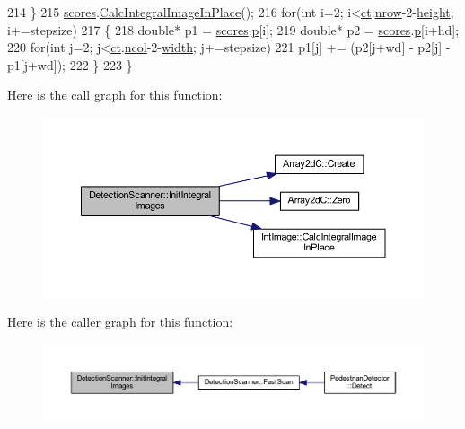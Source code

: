 \begin{DoxyCode}
214     \}
215     \mbox{\hyperlink{class_detection_scanner_a7358ec22675336179d3cad0809c7b883}{scores}}.\mbox{\hyperlink{class_int_image_a4b955bc5382ee4745a5ab92fc48b4a6a}{CalcIntegralImageInPlace}}();
216     \textcolor{keywordflow}{for}(\textcolor{keywordtype}{int} i=2; i<\mbox{\hyperlink{class_detection_scanner_a885861d4c08a9f9ae4da36f68866419b}{ct}}.\mbox{\hyperlink{class_array2d_c_a12f690f7195f7674a86a7e1eedbc473c}{nrow}}-2-\mbox{\hyperlink{class_detection_scanner_a0526f032d5e7efd9fced2592ad5c8d03}{height}}; i+=stepsize)
217     \{
218         \textcolor{keywordtype}{double}* p1 = \mbox{\hyperlink{class_detection_scanner_a7358ec22675336179d3cad0809c7b883}{scores}}.\mbox{\hyperlink{class_array2d_c_a727eae5d663d463635cc150e6f771f0d}{p}}[i];
219         \textcolor{keywordtype}{double}* p2 = \mbox{\hyperlink{class_detection_scanner_a7358ec22675336179d3cad0809c7b883}{scores}}.\mbox{\hyperlink{class_array2d_c_a727eae5d663d463635cc150e6f771f0d}{p}}[i+hd];
220         \textcolor{keywordflow}{for}(\textcolor{keywordtype}{int} j=2; j<\mbox{\hyperlink{class_detection_scanner_a885861d4c08a9f9ae4da36f68866419b}{ct}}.\mbox{\hyperlink{class_array2d_c_a27e0f8f40f644831cd7c750db59dc28a}{ncol}}-2-\mbox{\hyperlink{class_detection_scanner_a37d12c13060640ad0321f089cd565476}{width}}; j+=stepsize)
221             p1[j] += (p2[j+wd] - p2[j] - p1[j+wd]);
222     \}
223 \}
\end{DoxyCode}
Here is the call graph for this function\+:\nopagebreak
\begin{figure}[H]
\begin{center}
\leavevmode
\includegraphics[width=350pt]{class_detection_scanner_a3fda62eb396e2bff3e2cd2b8ec5079a1_cgraph}
\end{center}
\end{figure}
Here is the caller graph for this function\+:\nopagebreak
\begin{figure}[H]
\begin{center}
\leavevmode
\includegraphics[width=350pt]{class_detection_scanner_a3fda62eb396e2bff3e2cd2b8ec5079a1_icgraph}
\end{center}
\end{figure}
\mbox{\label{class_detection_scanner_a36c4db431f28648b82bd6e55afb67008}} 
